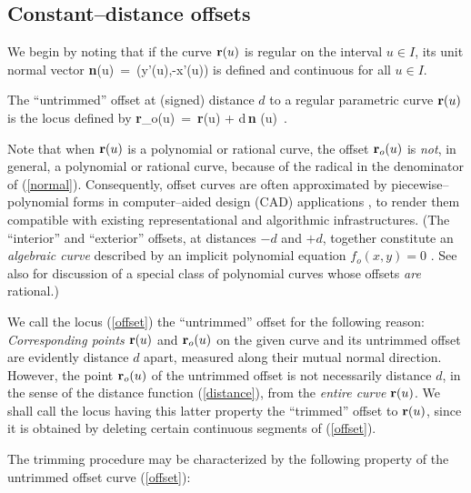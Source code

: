 \subsection{Constant--distance offsets}

We begin by noting that if the curve ${\bf r}(u)$ is regular on the
interval $u \in I$, its unit normal vector
\be \label{normal}
{\bf n}(u) \,=\, {(y'(u),-x'(u)) \over {}}
\ee
is defined and continuous for all $u \in I$.

\begin{dfn}
The ``untrimmed'' offset at (signed) distance $d$ to a regular parametric
curve ${\bf r}(u)$ is the locus defined by
\be \label{offset}
{\bf r}_o(u) \,=\, {\bf r}(u) + d\,{\bf n} (u) \,.
\ee
\end{dfn}

Note that when ${\bf r}(u)$ is a polynomial or rational curve,
the offset ${\bf r}_o(u)$ is {\it not}, in general, a polynomial
or rational curve, because of the radical in the denominator of
(\ref{normal}). Consequently, offset curves are often approximated
by piecewise--polynomial forms in computer--aided design (CAD)
applications \cite{hoschek88,klass83,pham88,tiller84}, to render
them compatible with existing representational and algorithmic
infrastructures. (The ``interior'' and ``exterior'' offsets, at
distances $-d$ and $+d$, together constitute an {\it algebraic
curve\/} described by an implicit polynomial equation $f_o(x,y)=0$
\cite{farouki90b}. See also \cite {farouki90c,farouki91a} for
discussion of a special class of polynomial curves whose offsets
{\it are\/} rational.)

We call the locus (\ref{offset}) the ``untrimmed'' offset for the
following reason: {\it Corresponding points\/} ${\bf r}(u)$ and
${\bf r}_o(u)$ on the given curve and its untrimmed offset are
evidently distance $d$ apart, measured along their mutual normal
direction. However, the point ${\bf r}_o(u)$ of the untrimmed offset
is not necessarily distance $d$, in the sense of the distance function
(\ref{distance}), from the {\it entire curve\/} ${\bf r}(u)$. We shall
call the locus having this latter property the ``trimmed'' offset to
${\bf r}(u)$, since it is obtained by deleting certain continuous
segments of (\ref{offset}).

The trimming procedure may be characterized by the following
property of the untrimmed offset curve (\ref{offset}):

